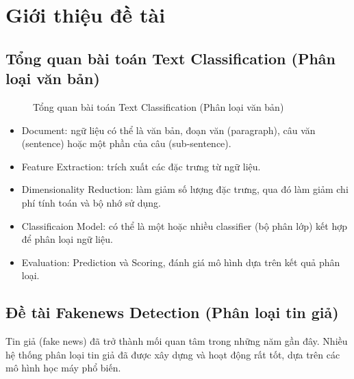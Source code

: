 \documentclass[12pt]{article}
\begin{document}
\begin{titlepage}
\vfill
\end{titlepage}
	
	
\tableofcontents
\pagebreak

\section{Giới thiệu đề tài}
\subsection{Tổng quan bài toán Text Classification (Phân loại văn bản)}
\begin{figure}[H]
	\centering
	\caption{Tổng quan bài toán Text Classification (Phân loại văn bản)\cite{Kowsari_2019}}
\end{figure}
\begin{itemize}
\item Document: ngữ liệu có thể là văn bản, đoạn văn (paragraph), câu văn (sentence) hoặc một phần của câu (sub-sentence).
\item Feature Extraction: trích xuất các đặc trưng từ ngữ liệu.
\item Dimensionality Reduction: làm giảm số lượng đặc trưng, qua đó làm giảm chi phí tính toán và bộ nhớ sử dụng.
\item Classificaion Model: có thể là một hoặc nhiều classifier (bộ phân lớp) kết hợp để phân loại ngữ liệu.
\item Evaluation: Prediction và Scoring, đánh giá mô hình dựa trên kết quả phân loại.
\end{itemize}

\subsection{Đề tài Fakenews Detection (Phân loại tin giả)}
Tin giả (fake news) đã trở thành mối quan tâm trong những năm gần đây. Nhiều hệ thống phân loại tin giả đã được xây dựng và hoạt động rất tốt, dựa trên các mô hình học máy phổ biến.
\end{document}

